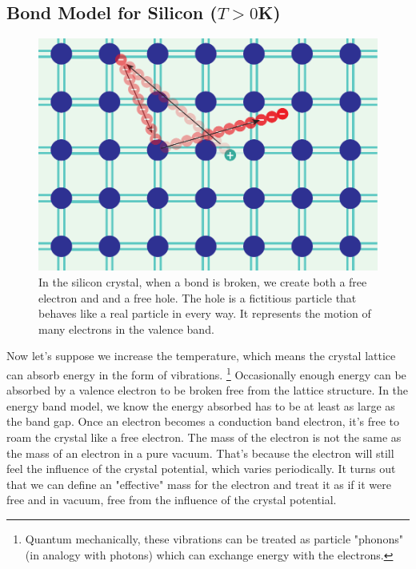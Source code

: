 \subsection{Bond Model for Silicon ($T>0$K)}
\begin{figure}[tb]
\begin{center}
\includegraphics[width=.5\columnwidth]{silicon_broken_bond_motion}
\end{center}
\caption{In the silicon crystal, when a bond is broken, we create both a free electron and and a free hole.  The hole is a fictitious particle that behaves like a real particle in every way. It represents the motion of many electrons in the valence band. }
\label{fig:silicon_broken_bond}
\end{figure}

Now let's suppose we increase the temperature, which means the crystal lattice can absorb energy in the form of vibrations.  \footnote{Quantum mechanically, these vibrations can be treated as particle "phonons" (in analogy with photons) which can exchange energy with the electrons.}  Occasionally enough energy can be absorbed by a valence electron to be broken free from the lattice structure.  In the energy band model, we know the energy absorbed has to be at least as large as the band gap.  Once an electron becomes a conduction band electron, it's free to roam the crystal like a free electron.  The mass of the electron is not the same as the mass of an electron in a pure vacuum.  That's because the electron will still feel the influence of the crystal potential, which varies periodically.  It turns out that we can define an "effective" mass for the electron and treat it as if it were free and in vacuum, free from the influence of the crystal potential. 

